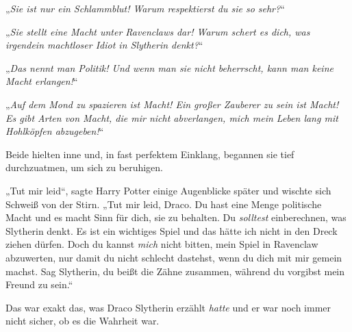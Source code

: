 „\emph{Sie ist nur ein Schlammblut! Warum respektierst du sie so sehr?}“

„\emph{Sie stellt eine Macht unter Ravenclaws dar! Warum schert es dich, was irgendein machtloser Idiot in Slytherin denkt?}“

„\emph{Das nennt man Politik! Und wenn man sie nicht beherrscht, kann man keine Macht erlangen!}“

„\emph{Auf dem Mond zu spazieren ist Macht! Ein großer Zauberer zu sein ist Macht! Es gibt Arten von Macht, die mir nicht abverlangen, mich mein Leben lang mit Hohlköpfen abzugeben!}“

Beide hielten inne und, in fast perfektem Einklang, begannen sie tief durchzuatmen, um sich zu beruhigen.

„Tut mir leid“, sagte Harry Potter einige Augenblicke später und wischte sich Schweiß von der Stirn.
„Tut mir leid, Draco. Du hast eine Menge politische Macht und es macht Sinn für dich, sie zu behalten. Du \emph{solltest} einberechnen, was Slytherin denkt. Es ist ein wichtiges Spiel und das hätte ich nicht in den Dreck ziehen dürfen. Doch du kannst \emph{mich} nicht bitten, mein Spiel in Ravenclaw abzuwerten, nur damit du nicht schlecht dastehst, wenn du dich mit mir gemein machst. Sag Slytherin, du beißt die Zähne zusammen, während du vorgibst mein Freund zu sein.“

Das war exakt das, was Draco Slytherin erzählt \emph{hatte} und er war noch immer nicht sicher, ob es die Wahrheit war.

